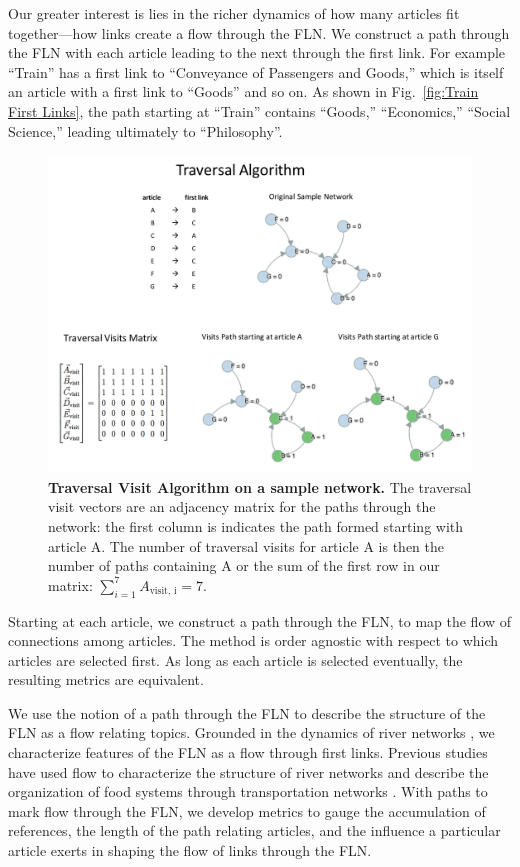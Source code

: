 \documentclass[pre,twocolumn,twoside,superscriptaddress,floatfix, aps, 10pt]{revtex4-1}
\begin{document}
Our greater interest is lies in the richer dynamics of how many articles fit together---how links create a flow through the FLN.
We construct a path through the FLN with each article 
leading to the next through the first link. 
For example ``Train'' has a first link to ``Conveyance of Passengers and Goods,'' which is itself
an article with a first link to ``Goods'' and so on. 
As shown in Fig.~\ref{fig:Train First Links}, the path starting at ``Train'' 
contains ``Goods,'' ``Economics,'' ``Social Science,''
leading ultimately to ``Philosophy''.

\begin{figure}[tp!]
  \includegraphics[width=\textwidth]{graphics/traversal_visit_algo_figure.pdf}  
  \caption{
    \textbf{Traversal Visit Algorithm on a sample network.}
     The traversal visit vectors are an adjacency matrix for the paths through the network: the first column is indicates the path formed starting with article A. The number of traversal visits for article A is then the number of paths containing A or the sum of the first row in our matrix:
     $\sum_{i=1}^7 A_{\text{visit, i}} = 7$.
  }
  \label{fig:Traversal Visits}
\end{figure}

Starting at each article, we construct a path through the FLN, 
to map the flow of connections among articles.
The method is order agnostic with respect to which articles are selected first. As long as each article is selected eventually, the resulting metrics are equivalent.

We use the notion of a path through the FLN to describe 
the structure of the FLN as a flow relating topics. 
Grounded in the dynamics of river networks
\cite{geo_basins},
we characterize features of the FLN as a flow through first links.
Previous studies have used flow to characterize the structure of river networks
\cite{dodds} and describe the organization of food systems through transportation networks
\cite{food_webs}.
With paths to mark flow through the FLN, we develop metrics to 
gauge the accumulation of references, 
the length of the path relating articles, and the influence a particular
article exerts in shaping the flow of links through the FLN.
\end{document}
